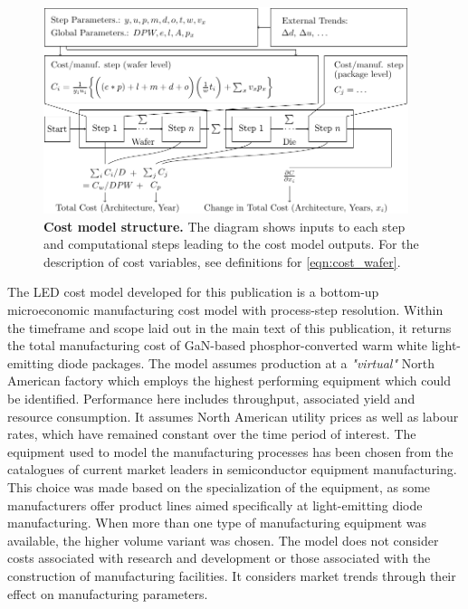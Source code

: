 \documentclass[parskip=full]{article}
\begin{document}
\begin{figure}[H]
    \centering
    \includegraphics[width=0.95\textwidth]{./figures/costmodel.pdf}
    \caption{\textbf{Cost model structure.} The diagram shows inputs to each step and computational steps leading to the cost model outputs. For the description of cost variables, see definitions for \cref{eqn:cost_wafer}.}
    \label{fig:costmodel-schematic}
\end{figure}

The LED cost model developed for this publication is a bottom-up microeconomic manufacturing cost model with process-step resolution. Within the timeframe and scope laid out in the main text of this publication, it returns the total manufacturing cost of GaN-based phosphor-converted warm white light-emitting diode packages. The model assumes production at a \textit{"virtual"} North American factory which employs the highest performing equipment which could be identified. Performance here includes throughput, associated yield and resource consumption. It assumes North American utility prices as well as labour rates, which have remained constant over the time period of interest. The equipment used to model the manufacturing processes has been chosen from the catalogues of current market leaders in semiconductor equipment manufacturing. This choice was made based on the specialization of the equipment, as some manufacturers offer product lines aimed specifically at light-emitting diode manufacturing. When more than one type of manufacturing equipment was available, the higher volume variant was chosen. The model does not consider costs associated with research and development or those associated with the construction of manufacturing facilities. It considers market trends through their effect on manufacturing parameters.
\end{document}
